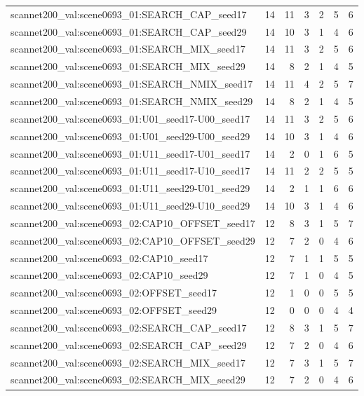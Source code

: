 \begin{table}[t]
\begin{tabular}{lrrrrrr}
scannet200\_val:scene0693\_01:SEARCH\_CAP\_seed17 & 14 & 11 & 3 & 2 & 5 & 6 \\
scannet200\_val:scene0693\_01:SEARCH\_CAP\_seed29 & 14 & 10 & 3 & 1 & 4 & 6 \\
scannet200\_val:scene0693\_01:SEARCH\_MIX\_seed17 & 14 & 11 & 3 & 2 & 5 & 6 \\
scannet200\_val:scene0693\_01:SEARCH\_MIX\_seed29 & 14 & 8 & 2 & 1 & 4 & 5 \\
scannet200\_val:scene0693\_01:SEARCH\_NMIX\_seed17 & 14 & 11 & 4 & 2 & 5 & 7 \\
scannet200\_val:scene0693\_01:SEARCH\_NMIX\_seed29 & 14 & 8 & 2 & 1 & 4 & 5 \\
scannet200\_val:scene0693\_01:U01\_seed17-U00\_seed17 & 14 & 11 & 3 & 2 & 5 & 6 \\
scannet200\_val:scene0693\_01:U01\_seed29-U00\_seed29 & 14 & 10 & 3 & 1 & 4 & 6 \\
scannet200\_val:scene0693\_01:U11\_seed17-U01\_seed17 & 14 & 2 & 0 & 1 & 6 & 5 \\
scannet200\_val:scene0693\_01:U11\_seed17-U10\_seed17 & 14 & 11 & 2 & 2 & 5 & 5 \\
scannet200\_val:scene0693\_01:U11\_seed29-U01\_seed29 & 14 & 2 & 1 & 1 & 6 & 6 \\
scannet200\_val:scene0693\_01:U11\_seed29-U10\_seed29 & 14 & 10 & 3 & 1 & 4 & 6 \\
scannet200\_val:scene0693\_02:CAP10\_OFFSET\_seed17 & 12 & 8 & 3 & 1 & 5 & 7 \\
scannet200\_val:scene0693\_02:CAP10\_OFFSET\_seed29 & 12 & 7 & 2 & 0 & 4 & 6 \\
scannet200\_val:scene0693\_02:CAP10\_seed17 & 12 & 7 & 1 & 1 & 5 & 5 \\
scannet200\_val:scene0693\_02:CAP10\_seed29 & 12 & 7 & 1 & 0 & 4 & 5 \\
scannet200\_val:scene0693\_02:OFFSET\_seed17 & 12 & 1 & 0 & 0 & 5 & 5 \\
scannet200\_val:scene0693\_02:OFFSET\_seed29 & 12 & 0 & 0 & 0 & 4 & 4 \\
scannet200\_val:scene0693\_02:SEARCH\_CAP\_seed17 & 12 & 8 & 3 & 1 & 5 & 7 \\
scannet200\_val:scene0693\_02:SEARCH\_CAP\_seed29 & 12 & 7 & 2 & 0 & 4 & 6 \\
scannet200\_val:scene0693\_02:SEARCH\_MIX\_seed17 & 12 & 7 & 3 & 1 & 5 & 7 \\
scannet200\_val:scene0693\_02:SEARCH\_MIX\_seed29 & 12 & 7 & 2 & 0 & 4 & 6 \\

\end{tabular}
\end{table}
